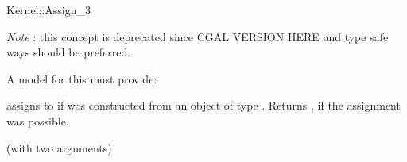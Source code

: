 \begin{ccRefFunctionObjectConcept}{Kernel::Assign_3}
\begin{ccDeprecated}
{\em Note} : this concept is deprecated since CGAL VERSION HERE and type safe ways should be preferred. 

A model for this must provide:


{assigns  to  if 
was constructed from an object of type .
Returns , if the assignment was possible.}

\ccRefines
{} (with two arguments)

\ccSeeAlso
 \\
 \\
  \\

\end{ccDeprecated}
\end{ccRefFunctionObjectConcept}
